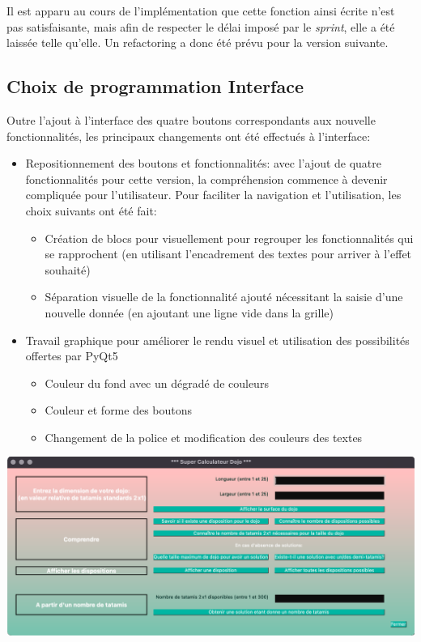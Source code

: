 Il est apparu au cours de l'implémentation que cette fonction ainsi écrite n'est pas satisfaisante, mais afin
de respecter le délai imposé par le \emph{sprint}, elle a été laissée telle qu'elle. Un refactoring a donc été
prévu pour la version suivante.

\subsection{Choix de programmation Interface}

Outre l’ajout à l'interface des quatre boutons correspondants aux nouvelle fonctionnalités, 
les principaux changements ont été effectués à l’interface:

\begin{itemize}
    \item Repositionnement des boutons et fonctionnalités: avec l’ajout de quatre fonctionnalités 
    pour cette version, la compréhension commence à devenir compliquée pour l’utilisateur. 
    Pour faciliter la navigation et l’utilisation, les choix suivants ont été fait:
    \begin{itemize}
        \item Création de blocs pour visuellement pour regrouper les fonctionnalités qui se rapprochent 
        (en utilisant l’encadrement des textes pour arriver à l'effet souhaité)
        \item Séparation visuelle de la fonctionnalité ajouté nécessitant la saisie d’une nouvelle 
        donnée (en ajoutant une ligne vide dans la grille)
    \end{itemize}

    \item Travail graphique pour améliorer le rendu visuel et utilisation des possibilités offertes par PyQt5
    
    \begin{itemize}
        \item  Couleur du fond avec un dégradé de couleurs
        \item Couleur et forme des boutons
        \item Changement de la police et modification des couleurs des textes
    \end{itemize}
\end{itemize}


\begin{center}
    \includegraphics[width=16cm]{images/releaseInterface.png}
\end{center}

